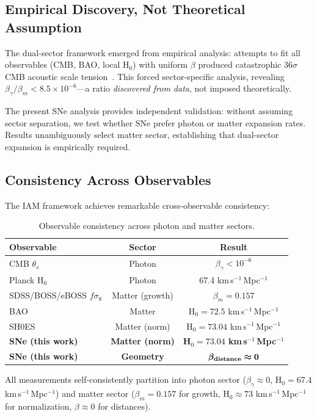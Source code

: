 \documentclass[twocolumn,superscriptaddress,prd,amsmath,amssymb]{revtex4-2}
\begin{document}
\subsection{Empirical Discovery, Not Theoretical Assumption}

The dual-sector framework emerged from empirical analysis: attempts to fit all observables (CMB, BAO, local H$_0$) with uniform $\beta$ produced catastrophic 36$\sigma$ CMB acoustic scale tension~\cite{IAMManuscript2025}. This forced sector-specific analysis, revealing $\beta_\gamma/\beta_m < 8.5 \times 10^{-6}$—a ratio \textit{discovered from data}, not imposed theoretically.

The present SNe analysis provides independent validation: without assuming sector separation, we test whether SNe prefer photon or matter expansion rates. Results unambiguously select matter sector, establishing that dual-sector expansion is empirically required.

\subsection{Consistency Across Observables}

The IAM framework achieves remarkable cross-observable consistency:

\begin{table}[h]
\centering
\begin{tabular}{lcc}
\hline\hline
Observable & Sector & Result \\
\hline
CMB $\theta_s$ & Photon & $\beta_\gamma < 10^{-6}$ \\
Planck H$_0$ & Photon & 67.4 km\,s$^{-1}$\,Mpc$^{-1}$ \\
\hline
SDSS/BOSS/eBOSS $f\sigma_8$ & Matter (growth) & $\beta_m = 0.157$ \\
BAO & Matter & H$_0 = 72.5$ km\,s$^{-1}$\,Mpc$^{-1}$ \\
SH0ES & Matter (norm) & H$_0 = 73.04$ km\,s$^{-1}$\,Mpc$^{-1}$ \\
\textbf{SNe (this work)} & \textbf{Matter (norm)} & \textbf{H$_0 = 73.04$ km\,s$^{-1}$\,Mpc$^{-1}$} \\
\textbf{SNe (this work)} & \textbf{Geometry} & $\bm{\beta_{\rm distance} \approx 0}$ \\
\hline\hline
\end{tabular}
\caption{Observable consistency across photon and matter sectors.}
\end{table}

All measurements self-consistently partition into photon sector ($\beta_\gamma \approx 0$, H$_0 = 67.4$ km\,s$^{-1}$\,Mpc$^{-1}$) and matter sector ($\beta_m = 0.157$ for growth, H$_0 \approx 73$ km\,s$^{-1}$\,Mpc$^{-1}$ for normalization, $\beta \approx 0$ for distances).
\end{document}
